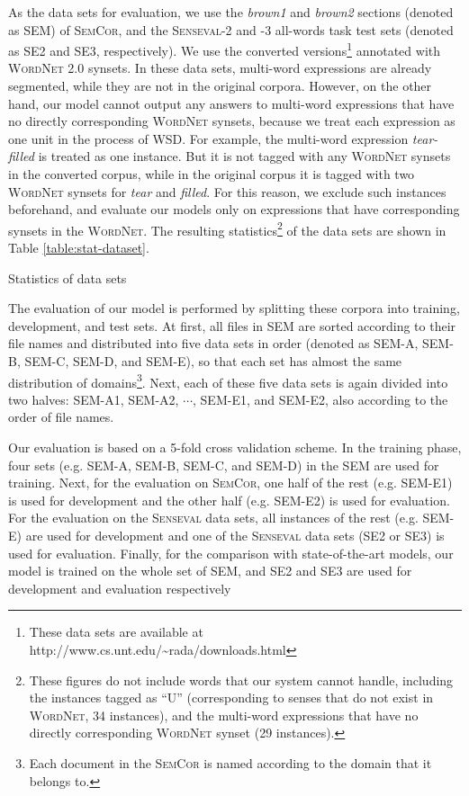 \documentclass[english]{jnlp_1.4}
\begin{document}
As the data sets for evaluation, we use the \textit{brown1} and \textit{brown2} sections (denoted as SEM) of \textsc{SemCor}, and the \textsc{Senseval}-2 and -3 all-words task test sets (denoted as SE2 and SE3, respectively).
We use the converted versions\footnote{These data sets are available at http://www.cs.unt.edu/\~{}rada/downloads.html} annotated with \textsc{WordNet} 2.0 synsets.
In these data sets, multi-word expressions are already segmented, while they are not in the original corpora.
However, on the other hand, our model cannot output any answers to multi-word expressions that have no directly corresponding \textsc{WordNet} synsets, because we treat each expression as one unit in the process of WSD.
For example, the multi-word expression \textit{tear-filled} is treated as one instance. But it is not tagged with any \textsc{WordNet} synsets in the converted corpus, while in the original corpus it is tagged with two \textsc{WordNet} synsets for \textit{tear} and \textit{filled}.
For this reason, we exclude such instances beforehand, and evaluate our models only on expressions that have corresponding synsets in the \textsc{WordNet}.
The resulting statistics\footnote{These figures do not include words that our system cannot handle, including the instances tagged as ``U'' (corresponding to senses that do not exist in \textsc{WordNet}, 34 instances), and the multi-word expressions that have no directly corresponding \textsc{WordNet} synset (29 instances). } of the data sets are shown in Table \ref{table:stat-dataset}.


\begin{table}[b]
\caption{Statistics of data sets}
\label{table:stat-dataset}

\end{table} 

The evaluation of our model is performed by splitting these corpora into training, development, and test sets.
At first, all files in SEM are sorted according to their file names and distributed into five data sets in order (denoted as SEM-A, SEM-B, SEM-C, SEM-D, and SEM-E), so that each set has almost the same distribution of domains\footnote{Each document in the \textsc{SemCor} is named according to the domain that it belongs to.}.
Next, each of these five data sets is again divided into two halves: SEM-A1, SEM-A2, $\cdots$, SEM-E1, and SEM-E2, also according to the order of file names.


Our evaluation is based on a 5-fold cross validation scheme.
In the training phase, four sets (e.g. SEM-A, SEM-B, SEM-C, and SEM-D) in the SEM are used for training.
Next, for the evaluation on \textsc{SemCor}, one half of the rest (e.g. SEM-E1) is used for development and the other half (e.g. SEM-E2) is used for evaluation.
For the evaluation on the \textsc{Senseval} data sets, all instances of the rest (e.g. SEM-E) are used for development and one of the \textsc{Senseval} data sets (SE2 or SE3) is used for evaluation.
Finally, for the comparison with state-of-the-art models, our model is trained on the whole set of SEM, and SE2 and SE3 are used for development and evaluation respectively
\end{document}
